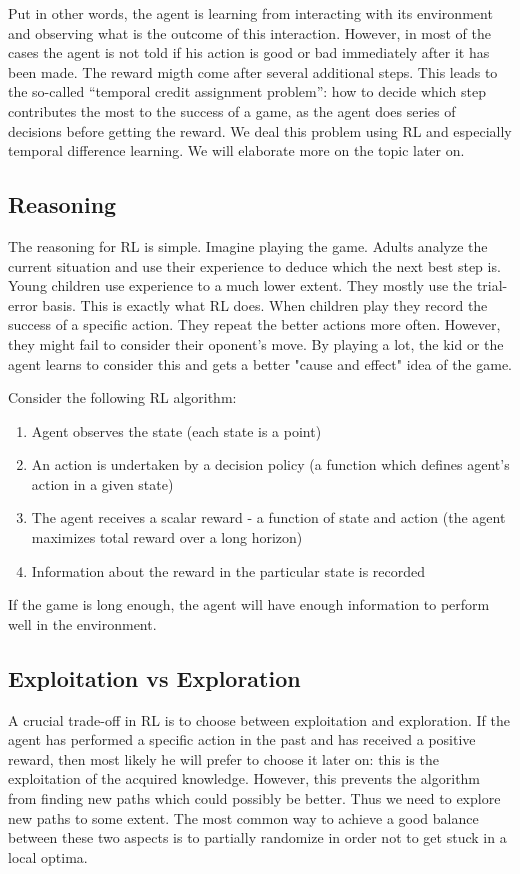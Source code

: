 \documentclass[fleqn]{article}
\begin{document}
Put in other words, the agent is learning from interacting with its environment and observing what is the outcome of this interaction. However, in most of the cases the agent is not told if his action is good or bad immediately after it has been made. The reward migth come after several additional steps. This leads to the so-called “temporal credit assignment problem”: how to decide which step contributes the most to the success of a game, as the agent does series of decisions before getting the reward. We deal this problem using RL and especially temporal difference learning. We will elaborate more on the topic later on.

\subsection{Reasoning}
The reasoning for RL is simple. Imagine playing the game. Adults analyze the current situation and use their experience to deduce which the next best step is. Young children use experience to a much lower extent. They mostly use the trial-error basis. This is exactly what RL does. When children play they record the success of a specific action. They repeat the better actions more often. However, they might fail to consider their oponent's move. By playing a lot, the kid or the agent learns to consider this and gets a better "cause and effect" idea of the game. 

Consider the following RL algorithm:  

\begin{enumerate}
	\item Agent observes the state (each state is a point)  
	\item An action is undertaken by a decision policy (a function which defines agent's action in a given state) 
	\item The agent receives a scalar reward - a function of state and action (the agent maximizes total reward over a long horizon)  
	\item  Information about the reward in the particular state is recorded 
\end{enumerate}

If the game is long enough, the agent will have enough information to perform well in the environment.    

\subsection{Exploitation vs Exploration}
A crucial trade-off in RL is to choose between exploitation and exploration. If the agent has performed a specific action in the past and has received a positive reward, then most likely he will prefer to choose it later on: this is the exploitation of the acquired knowledge. However, this prevents the algorithm from finding new paths which could possibly be better. Thus we need to explore new paths to some extent. The most common way to achieve a good balance between these two aspects is to partially randomize in order not to get stuck in a local optima.
\end{document}
